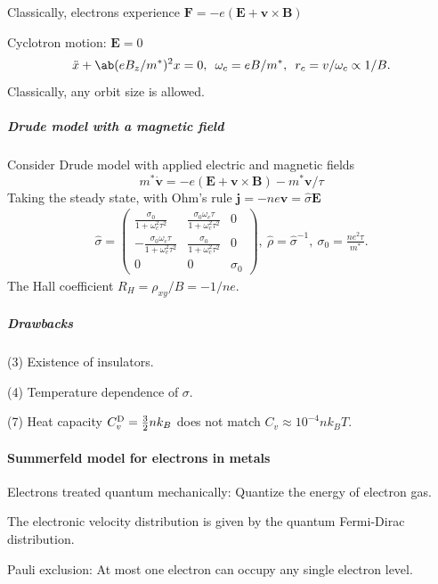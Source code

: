 \begin{enumext}
  \item Classically, electrons experience
  $\bm F = -e(\bm E + \bm v \times \bm B)$
  \item Cyclotron motion: $\bm E = 0$
  \[
    \ddot x + \ab(eB_z/m^*)^2x = 0, \enspace
    \omega_c = eB/m^*, \enspace
    r_c = v/\omega_c \propto 1/B.
  \]
  Classically, any orbit size is allowed.
\end{enumext}

\subparagraph{Drude model with a magnetic field}\leavevmode

Consider Drude model with applied electric and magnetic fields
\[
  m^*\dot{\bm v} = -e(\bm E + \bm v \times \bm B) - m^*\bm v/\tau
\]
Taking the steady state, with Ohm's rule $\bm j = -ne\bm v = \hat\sigma \bm E$
\begin{gather*}
  \hat\sigma =
  \begin{pmatrix}
    \frac{\sigma_0}{1 + \omega_c^2\tau^2} &
    \frac{\sigma_0\omega_c\tau}{1 + \omega_c^2\tau^2} & 0\\
   -\frac{\sigma_0\omega_c\tau}{1 + \omega_c^2\tau^2} &
    \frac{\sigma_0}{1 + \omega_c^2\tau^2} & 0\\
    0 & 0 & \sigma_0
  \end{pmatrix},\
  \hat\rho = \hat\sigma^{-1},\
  \sigma_0 = \frac{ne^2\tau}{m^*}.
\end{gather*}
The Hall coefficient $R_H = \rho_{xy}/B = -1/ne$.

\subparagraph{Drawbacks}

\begin{enumext*}[label = (\alph*), nosep, columns = 7]
  \item(3) Existence of insulators.
  \item(4) Temperature dependence of $\sigma$.
  \item(7) Heat capacity $C_v^\text D = \frac32nk_B$ does not match
  $C_v \approx 10^{-4} nk_BT$.
\end{enumext*}

\paragraph{Summerfeld model for electrons in metals}

\begin{enumext}
  \item Electrons treated quantum mechanically:
  Quantize the energy of electron gas.
  \item The electronic velocity distribution is given by the quantum
  Fermi-Dirac distribution.
  \item Pauli exclusion: At most one electron can occupy any single
  electron level.
\end{enumext}

